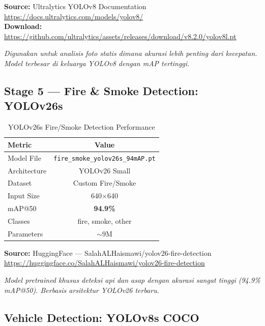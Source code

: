 \documentclass[12pt,a4paper]{article}
\begin{document}
\noindent\textbf{Source:} Ultralytics YOLOv8 Documentation\\
\url{https://docs.ultralytics.com/models/yolov8/}\\
\textbf{Download:} \url{https://github.com/ultralytics/assets/releases/download/v8.2.0/yolov8l.pt}

\vspace{1em}
\noindent\textit{Digunakan untuk analisis foto statis dimana akurasi lebih penting dari kecepatan. Model terbesar di keluarga YOLOv8 dengan mAP tertinggi.}

\subsection{Stage 5 — Fire \& Smoke Detection: YOLOv26s}

\begin{table}[H]
\centering
\caption{YOLOv26s Fire/Smoke Detection Performance}
\begin{tabular}{@{}lc@{}}
\toprule
\textbf{Metric} & \textbf{Value} \\
\midrule
Model File & \texttt{fire\_smoke\_yolov26s\_94mAP.pt} \\
Architecture & YOLOv26 Small \\
Dataset & Custom Fire/Smoke \\
Input Size & 640$\times$640 \\
mAP@50 & \textbf{94.9\%} \\
Classes & fire, smoke, other \\
Parameters & $\sim$9M \\
\bottomrule
\end{tabular}
\end{table}

\noindent\textbf{Source:} HuggingFace — SalahALHaismawi/yolov26-fire-detection\\
\url{https://huggingface.co/SalahALHaismawi/yolov26-fire-detection}

\vspace{1em}
\noindent\textit{Model pretrained khusus deteksi api dan asap dengan akurasi sangat tinggi (94.9\% mAP@50). Berbasis arsitektur YOLOv26 terbaru.}

\subsection{Vehicle Detection: YOLOv8s COCO}
\end{document}

